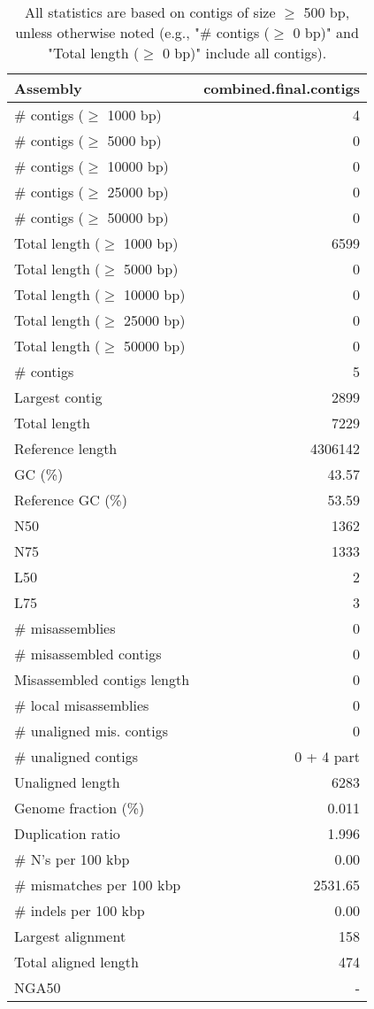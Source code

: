 \documentclass[12pt,a4paper]{article}
\begin{document}
\begin{table}[ht]
\begin{center}
\caption{All statistics are based on contigs of size $\geq$ 500 bp, unless otherwise noted (e.g., "\# contigs ($\geq$ 0 bp)" and "Total length ($\geq$ 0 bp)" include all contigs).}
\begin{tabular}{|l*{1}{|r}|}
\hline
Assembly & combined.final.contigs \\ \hline
\# contigs ($\geq$ 1000 bp) & 4 \\ \hline
\# contigs ($\geq$ 5000 bp) & 0 \\ \hline
\# contigs ($\geq$ 10000 bp) & 0 \\ \hline
\# contigs ($\geq$ 25000 bp) & 0 \\ \hline
\# contigs ($\geq$ 50000 bp) & 0 \\ \hline
Total length ($\geq$ 1000 bp) & 6599 \\ \hline
Total length ($\geq$ 5000 bp) & 0 \\ \hline
Total length ($\geq$ 10000 bp) & 0 \\ \hline
Total length ($\geq$ 25000 bp) & 0 \\ \hline
Total length ($\geq$ 50000 bp) & 0 \\ \hline
\# contigs & 5 \\ \hline
Largest contig & 2899 \\ \hline
Total length & 7229 \\ \hline
Reference length & 4306142 \\ \hline
GC (\%) & 43.57 \\ \hline
Reference GC (\%) & 53.59 \\ \hline
N50 & 1362 \\ \hline
N75 & 1333 \\ \hline
L50 & 2 \\ \hline
L75 & 3 \\ \hline
\# misassemblies & 0 \\ \hline
\# misassembled contigs & 0 \\ \hline
Misassembled contigs length & 0 \\ \hline
\# local misassemblies & 0 \\ \hline
\# unaligned mis. contigs & 0 \\ \hline
\# unaligned contigs & 0 + 4 part \\ \hline
Unaligned length & 6283 \\ \hline
Genome fraction (\%) & 0.011 \\ \hline
Duplication ratio & 1.996 \\ \hline
\# N's per 100 kbp & 0.00 \\ \hline
\# mismatches per 100 kbp & 2531.65 \\ \hline
\# indels per 100 kbp & 0.00 \\ \hline
Largest alignment & 158 \\ \hline
Total aligned length & 474 \\ \hline
NGA50 & - \\ \hline
\end{tabular}
\end{center}
\end{table}
\end{document}
